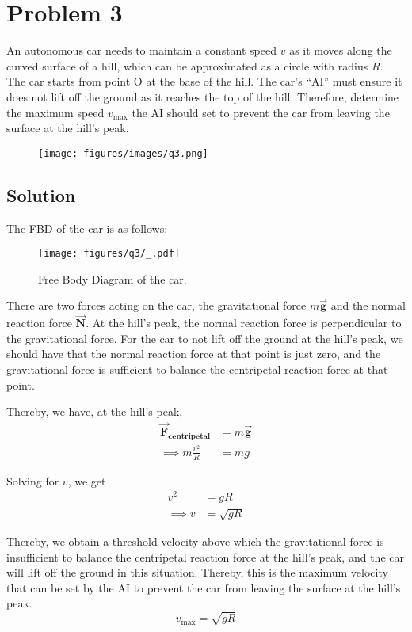 \section*{Problem 3}

An autonomous car needs to maintain a constant speed \( v \) as it moves along the curved surface of a hill, which can be approximated as a circle with radius \( R \).
The car starts from point O at the base of the hill.
The car's ``AI'' must ensure it does not lift off the ground as it reaches the top of the hill.
Therefore, determine the maximum speed \( v_{\max} \) the AI should set to prevent the car from leaving the surface at the hill's peak.

\begin{figure*}[h]
    \centering
    \texttt{[image: figures/images/q3.png]}
\end{figure*}

\subsection*{Solution}

The FBD of the car is as follows:
\begin{figure*}[h]
    \centering
    \texttt{[image: figures/q3/\_.pdf]}
    \caption{
        Free Body Diagram of the car.
    }
\end{figure*}

There are two forces acting on the car, the gravitational force \( m\vec{\mathbf{g}} \) and the normal reaction force \( \vec{\mathbf{N}} \).
At the hill's peak, the normal reaction force is perpendicular to the gravitational force.
For the car to not lift off the ground at the hill's peak, we should have that the normal reaction force at that point is just zero, and the gravitational force is sufficient to balance the centripetal reaction force at that point.

Thereby, we have, at the hill's peak,
\begin{align*}
    \vec{\mathbf{F}}_{\textbf{centripetal}}
     & =
    m\vec{\mathbf{g}}
    \\ \implies
    m\frac{v^2}{R}
     & =
    mg
\end{align*}

Solving for \( v \), we get
\begin{align*}
    v^2 & = gR        \\
    \implies
    v   & = \sqrt{gR}
\end{align*}

Thereby, we obtain a threshold velocity above which the gravitational force is insufficient to balance the centripetal reaction force at the hill's peak, and the car will lift off the ground in this situation.
Thereby, this is the maximum velocity that can be set by the AI to prevent the car from leaving the surface at the hill's peak.
\[
    \boxed{v_{\max} = \sqrt{gR}}
\]
